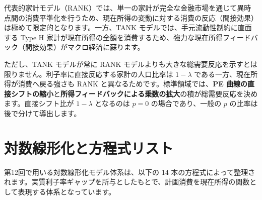 \documentclass[
  japanese,
  lualatex,
  ja=standard,
  12pt,
  a4paper]{ltjsarticle}
\begin{document}
代表的家計モデル（RANK）では、単一の家計が完全な金融市場を通じて異時点間の消費平準化を行うため、現在所得の変動に対する消費の反応（間接効果）は極めて限定的となります。一方、TANK
モデルでは、手元流動性制約に直面する Type H
家計が現在所得の全額を消費するため、強力な現在所得フィードバック（間接効果）がマクロ経済に蘇ります。

ただし、TANK モデルが常に RANK
モデルよりも大きな総需要反応を示すとは限りません。利子率に直接反応する家計の人口比率は
\(1-\lambda\) である一方、現在所得が消費へ戻る強さも RANK
と異なるためです。標準領域では、\textbf{PE
曲線の直接シフトの縮小}と\textbf{所得フィードバックによる乗数の拡大}の積が総需要反応を決めます。直接シフト比が
\(1-\lambda\) となるのは \(p=0\) の場合であり、一般の \(p\)
の比率は後で分けて導出します。


\section{対数線形化と方程式リスト}\label{ux5bfeux6570ux7ddaux5f62ux5316ux3068ux65b9ux7a0bux5f0fux30eaux30b9ux30c8}

第12回で用いる対数線形化モデル体系は、以下の 14
本の方程式によって整理されます。実質利子率ギャップを所与としたもとで、計画消費を現在所得の関数として表現する体系となっています。
\end{document}
